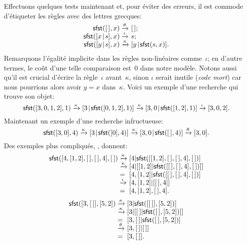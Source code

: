Effectuons quelques tests maintenant et, pour éviter des erreurs, il
est commode d'étiqueter les règles avec des lettres grecques:
\begin{equation*}
\begin{array}{r@{\;}l@{\;}l}
\fun{sfst}(\el,x)          & \smashedrightarrow{\theta} & \el;\\
\fun{sfst}(\cons{x}{s},x)  & \smashedrightarrow{\iota}  & s;\\
\fun{sfst}(\cons{y}{s},x)  & \smashedrightarrow{\kappa} &
\cons{y}{\fun{sfst}(s,x)}.
\end{array}
\end{equation*}
Remarquons l'égalité implicite dans les règles non-linéaires
comme~\(\iota\); en d'autre termes, le coût d'une telle comparaison
est~\(0\) dans notre modèle. Notons aussi qu'il est crucial d'écrire
la règle~\(\iota\) avant~\(\kappa\), sinon \(\iota\) serait inutile
(\emph{code mort}) car nous
pourrions alors avoir \(y = x\) dans~\(\kappa\). Voici un
exemple d'une recherche qui trouve son
objet:
\begin{equation*}
\textsf{sfst}([3,0,1,2],1) \xrightarrow{\smash{\kappa}}
[{3}\!\mid\!{\textsf{sfst}([0,1,2],1)}] \xrightarrow{\smash{\kappa}}
[{3,0}\!\mid\!{\textsf{sfst}([1,2],1)}] \xrightarrow{\smash{\iota}} [3,0,2].
\end{equation*}
Maintenant un exemple d'une recherche
infructueuse:
\begin{equation*}
\textsf{sfst}([3,0],4) \xrightarrow{\smash{\kappa}}
[{3}\!\mid\!{\textsf{sfst}([0],4)}] \xrightarrow{\smash{\kappa}}
[{3,0}\!\mid\!{\textsf{sfst}([\,],4)}] \xrightarrow{\smash{\theta}}
[3,0].
\end{equation*}
Des exemples plus compliqués, , donnent:
\begin{equation*}
\begin{array}{r@{\;}l@{\;}l}
\fun{sfst}([4,[1,2],\el,\el,4],\el)
& \smashedrightarrow{\kappa} &
  [4|\fun{sfst}([[1,2],\el,\el,4],\el)]\\
& \smashedrightarrow{\kappa} &
  [4|[[1,2]|\fun{sfst}([\el,\el,4],\el)]]\\
& = & [4,[1,2]|\fun{sfst}([\el,\el,4],\el)]\\
& \smashedrightarrow{\iota} & [4,[1,2]|[\el,4]]\\
& = & [4,[1,2],\el,4].
\end{array}
\end{equation*}
\begin{equation*}
\begin{array}{r@{\;}l@{\;}l}
\fun{sfst}([3,\el],[5,2])
& \smashedrightarrow{\kappa} & [3|\fun{sfst}([\el],[5,2])]\\
& \smashedrightarrow{\kappa} & [3|[\el|\fun{sfst}(\el,[5,2])]]\\
& = & [3,\el|\fun{sfst}(\el,[5,2])]\\
& \smashedrightarrow{\theta} & [3,\el|\el]\\
& = & [3,\el].
\end{array}
\end{equation*}
